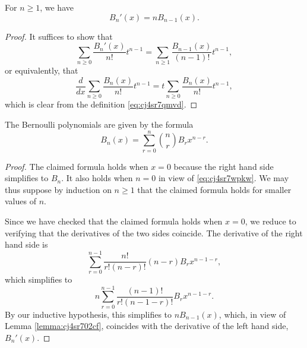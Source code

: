 \documentclass[reqno]{amsart} 
\begin{document}
\begin{lemma}\label{lemma:cj4sr702cf}
  For $n \geq 1$, we have
  \begin{equation*}
B_n'(x) = n B_{n-1}(x).
\end{equation*}
\end{lemma}
\begin{proof}
  It suffices to show that
  \begin{equation*}
    \sum_{n \geq 0} \frac{B_n'(x)}{n!} t^{n-1}
    =
\sum_{n \geq 1} \frac{B_{n-1}(x)}{(n-1)!} t^{n-1},
\end{equation*}
or equivalently, that
\begin{equation*}
\frac{d}{d x } \sum_{n \geq 0 } \frac{B_n(x)}{n!} t^{n-1} = t \sum_{n \geq 0 } \frac{B_n (x)}{ n !} t^{n-1},
\end{equation*}
which is clear from the definition \eqref{eq:cj4sr7qmvd}.
\end{proof}

\begin{lemma}\label{lemma:cj4vkas8qw}
The Bernoulli polynomials are given by the formula
\begin{equation*}
B_n (x) = \sum_{r = 0}^n \binom{n}{r} B_r x^{n - r}.
\end{equation*}
\end{lemma}
\begin{proof}
  The claimed formula holds when $x=0$ because the right hand side simplifies to $B_n$.  It also holds when $n = 0$ in view of \eqref{eq:cj4sr7wpkw}.  We may thus suppose by induction on $n \geq 1$ that the claimed formula holds for smaller values of $n$.

  Since we have checked that the claimed formula holds when $x=0$, we reduce to verifying that the derivatives of the two sides coincide.  The derivative of the right hand side is
  \begin{equation*}
\sum_{r = 0 }^{n - 1 } \frac{n!}{r! (n-r)!} (n-r) B_r x^{n-1-r},
\end{equation*}
which simplifies to
\begin{equation*}
 n \sum_{r = 0 }^{n - 1 } \frac{(n-1)!}{r! (n-1-r)!} B_r x^{n-1-r}.
\end{equation*}
By our inductive hypothesis, this simplifies to $n B_{n-1}(x)$, which, in view of Lemma \ref{lemma:cj4sr702cf}, coincides with the derivative of the left hand side, $B_n'(x)$.
\end{proof}
\end{document}
